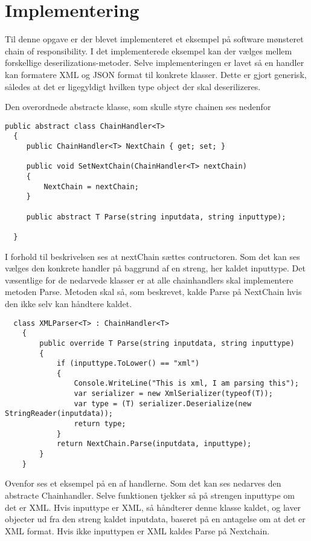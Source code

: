 \chapter{Implementering}

Til denne opgave er der blevet implementeret et eksempel på software mønsteret chain of responsibility. I det implementerede eksempel kan der vælges mellem forskellige deserilizations-metoder. Selve implementeringen er lavet så en handler kan formatere XML og JSON format til konkrete klasser. Dette er gjort generisk, således at det er ligegyldigt hvilken type object der skal deserilizeres. 

Den overordnede abstracte klasse, som skulle styre chainen ses nedenfor

\begin{lstlisting}
public abstract class ChainHandler<T>
  {
     public ChainHandler<T> NextChain { get; set; }

     public void SetNextChain(ChainHandler<T> nextChain)
     {
         NextChain = nextChain;
     }

     public abstract T Parse(string inputdata, string inputtype);

  }
\end{lstlisting}  

I forhold til beskrivelsen ses at nextChain sættes contructoren. Som det kan ses vælges den konkrete handler på baggrund af en streng, her kaldet inputtype. Det væsentlige for de nedarvede klasser er at alle chainhandlers skal implementere metoden Parse. Metoden skal så, som beskrevet, kalde Parse på NextChain hvis den ikke selv kan håndtere kaldet.

\begin{lstlisting}
  class XMLParser<T> : ChainHandler<T>
    {
        public override T Parse(string inputdata, string inputtype)
        {
            if (inputtype.ToLower() == "xml")
            {
                Console.WriteLine("This is xml, I am parsing this");
                var serializer = new XmlSerializer(typeof(T));
                var type = (T) serializer.Deserialize(new StringReader(inputdata));
                return type;
            }
            return NextChain.Parse(inputdata, inputtype);
        }
    }
\end{lstlisting} 

Ovenfor ses et eksempel på en af handlerne. Som det kan ses nedarves den abstracte Chainhandler. Selve funktionen tjekker så på strengen inputtype om det er XML. Hvis inputtype er XML, så håndterer denne klasse kaldet, og laver objecter ud fra den streng kaldet inputdata, baseret på en antagelse om at det er XML format. Hvis ikke inputtypen er XML kaldes Parse på Nextchain. 

